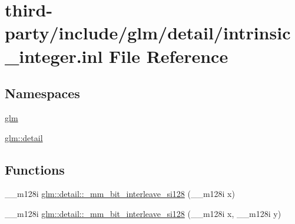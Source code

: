 \hypertarget{intrinsic__integer_8inl}{}\section{third-\/party/include/glm/detail/intrinsic\+\_\+integer.inl File Reference}
\label{intrinsic__integer_8inl}
\subsection*{Namespaces}
\begin{DoxyCompactItemize}
\item 
 \hyperlink{namespaceglm}{glm}
\item 
 \hyperlink{namespaceglm_1_1detail}{glm\+::detail}
\end{DoxyCompactItemize}
\subsection*{Functions}
\begin{DoxyCompactItemize}
\item 
\+\_\+\+\_\+m128i \hyperlink{namespaceglm_1_1detail_a7b6a3cafad145a8822948c1ff67bbb52}{glm\+::detail\+::\+\_\+mm\+\_\+bit\+\_\+interleave\+\_\+si128} (\+\_\+\+\_\+m128i x)
\item 
\+\_\+\+\_\+m128i \hyperlink{namespaceglm_1_1detail_ac724655d68946b6da149f12ae6389c09}{glm\+::detail\+::\+\_\+mm\+\_\+bit\+\_\+interleave\+\_\+si128} (\+\_\+\+\_\+m128i x, \+\_\+\+\_\+m128i y)
\end{DoxyCompactItemize}
